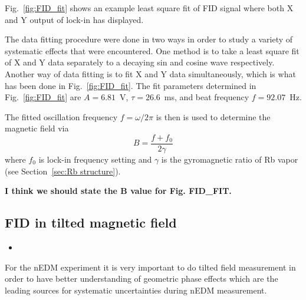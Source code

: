 Fig.~\ref{fig:FID_fit} shows an example least square fit of FID signal
where both X and Y output of lock-in has displayed.

The data fitting procedure were done in two ways in order to study a
variety of systematic effects that were encountered. One method is to
take a least square fit of X and Y data separately to a decaying sin
and cosine wave respectively.  Another way of data fitting is to fit X
and Y data simultaneously, which is what has been done in
Fig.~\ref{fig:FID_fit}.  The fit parameters determined in
Fig.~\ref{fig:FID_fit} are $A=6.81$~V, $\tau=26.6$~ms, and beat
frequency $f=92.07$~Hz.

The fitted oscillation frequency $f=\omega/2\pi$ is then is used to
determine the magnetic field via
\begin{equation}
B=\frac{f+f_0}{2\gamma}\label{eq:field}
\end{equation}
where $f_0$ is lock-in frequency setting and $\gamma$ is the
gyromagnetic ratio of Rb vapor (see Section~\ref{sec:Rb structure}).

{\bf I think we should state the B value for Fig. FID\_FIT.}

 




\subsection{FID in tilted magnetic field}

\begin{itemize}
\item
\end{itemize}


For the nEDM experiment it is very important to do tilted field
measurement in order to have better understanding of geometric phase
effects which are the leading sources for systematic uncertainties
during nEDM measurement.




